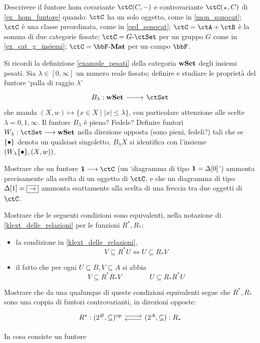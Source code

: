 \begin{esercizi}
	\item Descrivere il funtore hom covariante \(\Hom\ctC(C,-)\) e controvariante \(\Hom\ctC(\blank,C)\) di \ref{ex_hom_funtore} quando: \(\ctC\) ha un solo oggetto, come in \ref{mon_sonocat}; \(\ctC\) è una classe preordinata, come in \ref{ord_sonocat}; \(\ctC = \ctA+\ctB\) è la somma di due categorie fissate; \(\ctC = G\emdash\ctSet\) per un gruppo \(G\) come in \ref{ex_cat_g_insiemi}; \(\ctC = \ctMat\) per un campo \(\bbF\).
	\item Si ricordi la definizione \ref{example_pesati} della categoria \(\mathbf{wSet}\) degli insiemi pesati. Sia \(\lambda\in[0,\infty]\) un numero reale fissato; definire e studiare le proprietà del funtore `palla di raggio \(\lambda\)'
	\[\dmFun{B_\lambda}{\cate{wSet}}{\ctSet}\]
	che manda \((X,w)\mapsto \{x\in X\mid |x|\le \lambda\}\), con particolare attenzione alle scelte \(\lambda=0,1,\infty\). Il funtore \(B_\lambda\) è pieno? Fedele? Definire funtori \(W_\lambda : \ctSet \fun\cate{wSet}\) nella direzione opposta (sono pieni, fedeli?) tali che se \(\{\bullet\}\) denota un qualsiasi singoletto, \(B_\lambda X\) si identifica con l'insieme \((W_\lambda\{\bullet\},(X,w))\).
	\item \label{gfdpgubai_1} Mostrare che un funtore \(\ctTerm \fun\ctC\) (un `diagramma di tipo \(\mathbf{1} = \Delta[0]\)') ammonta precisamente alla scelta di un oggetto di \(\ctC\), e che un diagramma di tipo \(\Delta[1] = \boxed{\to}\) ammonta esattamente alla scelta di una freccia tra due oggetti di \(\ctC\).
	\item \label{gfdpgubai_2} Mostrare che le seguenti condizioni sono equivalenti, nella notazione di \ref{klext_delle_relazioni} per le funzioni \(R^*,R_*\):
	\begin{itemize}
		\item la condizione in \ref{klext_delle_relazioni},
		      \[V\subseteq R^*U\iff U\subseteq R_*V\]
		\item il fatto che per ogni \(U\subseteq B,V\subseteq A\) si abbia
		      \[V\subseteq R^*R_*V\qquad\qquad U\subseteq R_*R^*U\]
	\end{itemize}
	Mostrare che da una qualunque di queste condizioni equivalenti segue che \(R^*,R_*\) sono una coppia di funtori controvarianti, in direzioni opposte:
	\[\begin{tikzcd}
			R^* : (\pow B,\subseteq)^\op \ar[r, shift left] & (\pow A,\subseteq) : R_* \ar[l, shift left]
		\end{tikzcd}\]
	\item \label{gfdpgubai_3} In cosa consiste un funtore

\end{esercizi}
